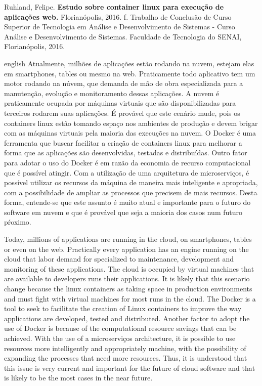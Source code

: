 \noindent
Ruhland, Felipe. \textbf{Estudo sobre container linux para execução de aplicações web.}
Florianópolis, 2016. \pageref{nropaginas}f. Trabalho de Conclusão de Curso Superior de Tecnologia em
Análise e Desenvolvimento de Sistemas - Curso Análise e Desenvolvimento de Sistemas. Faculdade de Tecnologia do
SENAI, Florianópolis, 2016.

\vspace{1cm}
\begin{resumo}
 \begin{otherlanguage*}{english}
Atualmente, milhões de aplicações estão rodando na nuvem, estejam elas em smartphones, tables ou mesmo na web. Praticamente todo aplicativo tem um motor rodando na núvem, que demanda de mão de obra especializada para a manutenção, evolução e monitoramento dessas aplicações. A nuvem é praticamente ocupada por máquinas virtuais que são disponibilizadas para terceiros rodarem suas aplicações. É provável que este cenário mude, pois os containers linux estão tomando espaço nos ambientes de produção e devem brigar com as máquinas virtuais pela maioria das execuções na nuvem. O Docker é uma ferramenta que buscar facilitar a criação de containers linux para melhorar a forma que as aplicações são desenvolvidas, testadas e distribuídas. Outro fator para adotar o uso do Docker é em razão da economia de recurso computacional que é possível atingir. Com a utilização de uma arquitetura de microserviços, é possível utilizar os recursos da máquina de maneira mais inteligente e apropriada, com a possibilidade de ampliar as processos que precisem de mais recursos. Desta forma, entende-se que este assunto é muito atual e importante para o futuro do software em nuvem e que é provável que seja a maioria dos casos num futuro pŕoximo.

Today, millions of applications are running in the cloud, on smartphones, tables or even on the web. Practically every application has an engine running on the cloud that labor demand for specialized to maintenance, development and monitoring of these applications. The cloud is occupied by virtual machines that are available to developers runs their applications. It is likely that this scenario change because the linux containers as taking space in production environments and must fight with virtual machines for most runs in the cloud. The Docker is a tool to seek to facilitate the creation of Linux containers to improve the way applications are developed, tested and distributed. Another factor to adopt the use of Docker is because of the computational resource savings that can be achieved. With the use of a microserviços architecture, it is possible to use resources more intelligently and appropriately machine, with the possibility of expanding the processes that need more resources. Thus, it is understood that this issue is very current and important for the future of cloud software and that is likely to be the most cases in the near future.
   \vspace{\onelineskip}
 

\end{otherlanguage*}
\end{resumo}
